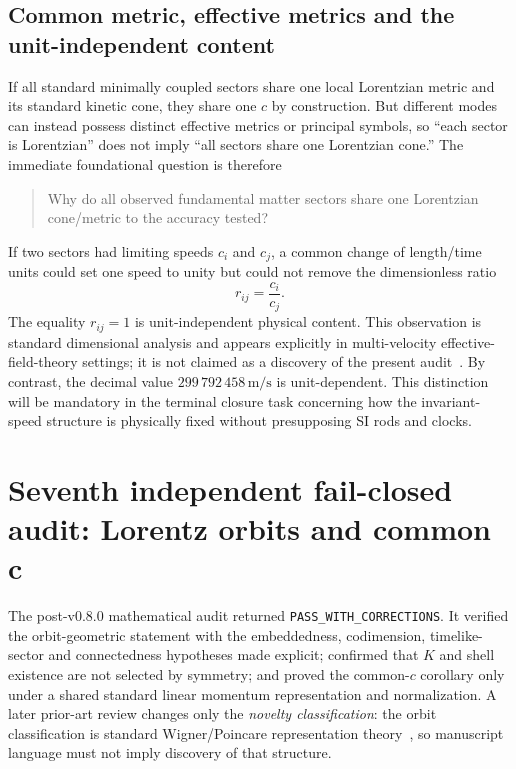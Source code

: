 \documentclass[11pt,a4paper]{article}
\begin{document}
\subsection{Common metric, effective metrics and the unit-independent content}
If all standard minimally coupled sectors share one local Lorentzian metric and its standard kinetic cone, they share one $c$ by construction.  But different modes can instead possess distinct effective metrics or principal symbols, so ``each sector is Lorentzian'' does not imply ``all sectors share one Lorentzian cone.''  The immediate foundational question is therefore
\begin{quote}
Why do all observed fundamental matter sectors share one Lorentzian cone/metric to the accuracy tested?
\end{quote}
If two sectors had limiting speeds $c_i$ and $c_j$, a common change of length/time units could set one speed to unity but could not remove the dimensionless ratio
\begin{equation}
 r_{ij}=\frac{c_i}{c_j}.
\end{equation}
The equality $r_{ij}=1$ is unit-independent physical content.  This observation is standard dimensional analysis and appears explicitly in multi-velocity effective-field-theory settings; it is not claimed as a discovery of the present audit~\cite{hermele2007}.  By contrast, the decimal value $299\,792\,458\,\mathrm{m/s}$ is unit-dependent.  This distinction will be mandatory in the terminal closure task concerning how the invariant-speed structure is physically fixed without presupposing SI rods and clocks.

\section{Seventh independent fail-closed audit: Lorentz orbits and common c}
The post-v0.8.0 mathematical audit returned \texttt{PASS\_WITH\_CORRECTIONS}.  It verified the orbit-geometric statement with the embeddedness, codimension, timelike-sector and connectedness hypotheses made explicit; confirmed that $K$ and shell existence are not selected by symmetry; and proved the common-$c$ corollary only under a shared standard linear momentum representation and normalization.  A later prior-art review changes only the \emph{novelty classification}: the orbit classification is standard Wigner/Poincare representation theory~\cite{wigner1939,weinberg1995}, so manuscript language must not imply discovery of that structure.
\end{document}

